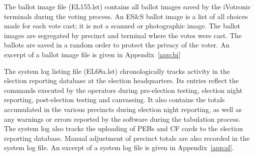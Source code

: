 The ballot image file (EL155.lst) contains all ballot images saved by
the iVotronic terminals during the voting process. An ES\&S ballot image
is a list of all choices made for each vote cast; it is not a scanned
or photographic image. The ballot images are segregated by precinct and
terminal where the votes were cast. The ballots are saved in a random
order to protect the privacy of the voter.  An excerpt of a ballot image
file is given in Appendix~\ref{app:bi}
 
The system log listing file (EL68a.lst) chronologically tracks activity
in the election reporting database at the election headquarters. Its
entries reflect the commands executed by the operators during
pre-election testing, election night reporting, post-election testing
and canvassing. It also contains the totals accumulated in the various
precincts during election night reporting, as well as any warnings or
errors reported by the software during the tabulation process.
The system log also tracks the uploading of PEBs and CF cards to the
election reporting database. Manual adjustment of precinct totals are
also recorded in the system log file. An excerpt of a system log file is
given in Appendix~\ref{app:sl}. 
